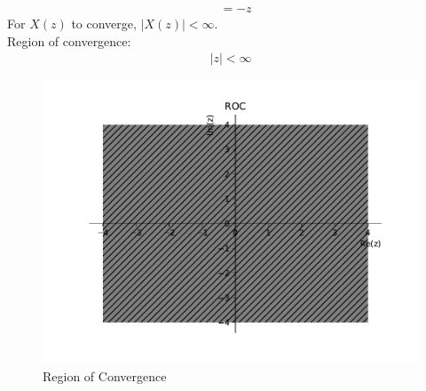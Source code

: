 \documentclass[journal,12pt,twocolumn]{IEEEtran}
\providecommand{\abs}[1]{\left\vert#1\right\vert}
\numberwithin{equation}{section}
\begin{document}
\begin{enumerate}[label=\arabic*]
\begin{align}
&=-z
\end{align}
For $X(z)$ to converge, $\abs{X(z)}<\infty$.\\
Region of convergence:
\begin{align}
\abs{z} < \infty
\end{align}
\begin{figure}[!ht]
\begin{centering}
\includegraphics[width=\columnwidth]{./figs/roc}
\end{centering}
\caption{Region of Convergence}
\end{figure}
\end{enumerate} 
 
\end{document}
